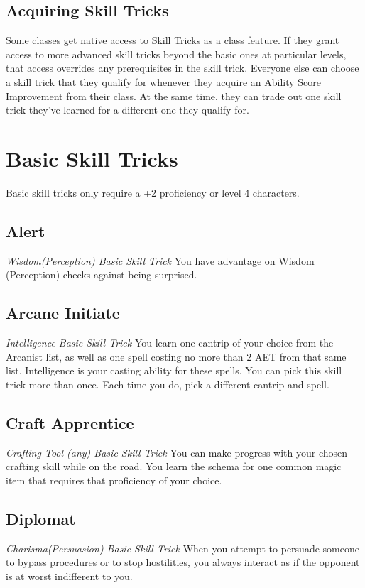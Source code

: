 \subsection{Acquiring Skill Tricks}
\label{subsec:acquiring-skill-tricks}

Some classes get native access to Skill Tricks as a class feature. If they grant access to more advanced skill tricks beyond the basic ones at particular levels, that access overrides any prerequisites in the skill trick. Everyone else can choose a skill trick that they qualify for whenever they acquire an Ability Score Improvement from their class. At the same time, they can trade out one skill trick they've learned for a different one they qualify for.

\section{Basic Skill Tricks}
\label{sec:skill-tricks-basic}

Basic skill tricks only require a +2 proficiency or level 4 characters.

\subsection{Alert}
\textit{Wisdom(Perception) Basic Skill Trick}
You have advantage on Wisdom (Perception) checks against being surprised.

\subsection{Arcane Initiate}
\textit{Intelligence Basic Skill Trick}
You learn one cantrip of your choice from the Arcanist list, as well as one spell costing no more than 2 AET from that same list. Intelligence is your casting ability for these spells. You can pick this skill trick more than once. Each time you do, pick a different cantrip and spell.

\subsection{Craft Apprentice}\label{st:craft-apprentice}
\textit{Crafting Tool (any) Basic Skill Trick}
You can make progress with your chosen crafting skill while on the road. You learn the schema for one common magic item that requires that proficiency of your choice.

\subsection{Diplomat}\label{st:diplomat}
\textit{Charisma(Persuasion) Basic Skill Trick}
When you attempt to persuade someone to bypass procedures or to stop hostilities, you always interact as if the opponent is at worst indifferent to you.

